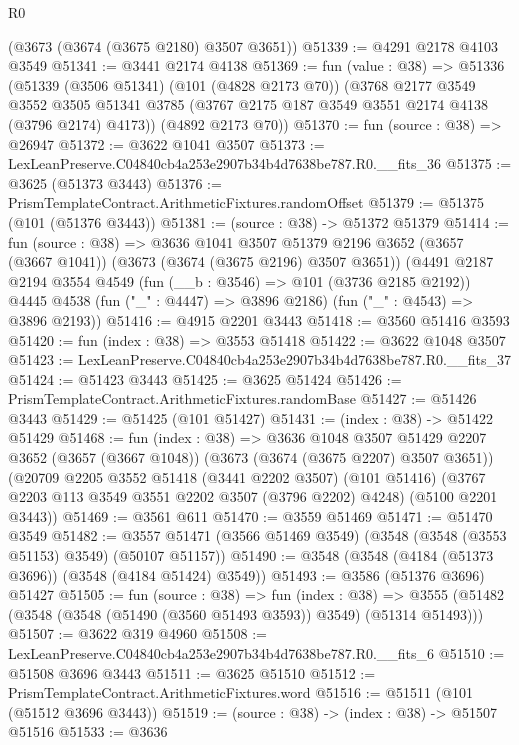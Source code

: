 \begin{lexlean}{R0}
\begin{coremodule}
    (@3673 (@3674 (@3675 @2180) @3507 @3651))
@51339 := @4291 @2178 @4103 @3549
@51341 := @3441 @2174 @4138
@51369 := fun (value : @38) =>
  @51336
    (@51339
      (@3506 @51341)
      (@101 (@4828 @2173 @70))
      (@3768
        @2177
        @3549
        @3552
        @3505
        @51341
        @3785
        (@3767 @2175 @187 @3549 @3551 @2174 @4138 (@3796 @2174) @4173))
      (@4892 @2173 @70))
@51370 := fun (source : @38) => @26947
@51372 := @3622 @1041 @3507
@51373 := LexLeanPreserve.C04840cb4a253e2907b34b4d7638be787.R0.__fits_36
@51375 := @3625 (@51373 @3443)
@51376 := PrismTemplateContract.ArithmeticFixtures.randomOffset
@51379 := @51375 (@101 (@51376 @3443))
@51381 := (source : @38) -> @51372 @51379
@51414 := fun (source : @38) =>
  @3636
    @1041
    @3507
    @51379
    @2196
    @3652
    (@3657 (@3667 @1041))
    (@3673 (@3674 (@3675 @2196) @3507 @3651))
    (@4491
      @2187
      @2194
      @3554
      @4549
      (fun (__b : @3546) => @101 (@3736 @2185 @2192))
      @4445
      @4538
      (fun ("_" : @4447) => @3896 @2186)
      (fun ("_" : @4543) => @3896 @2193))
@51416 := @4915 @2201 @3443
@51418 := @3560 @51416 @3593
@51420 := fun (index : @38) => @3553 @51418
@51422 := @3622 @1048 @3507
@51423 := LexLeanPreserve.C04840cb4a253e2907b34b4d7638be787.R0.__fits_37
@51424 := @51423 @3443
@51425 := @3625 @51424
@51426 := PrismTemplateContract.ArithmeticFixtures.randomBase
@51427 := @51426 @3443
@51429 := @51425 (@101 @51427)
@51431 := (index : @38) -> @51422 @51429
@51468 := fun (index : @38) =>
  @3636
    @1048
    @3507
    @51429
    @2207
    @3652
    (@3657 (@3667 @1048))
    (@3673 (@3674 (@3675 @2207) @3507 @3651))
    (@20709
      @2205
      @3552
      @51418
      (@3441 @2202 @3507)
      (@101 @51416)
      (@3767 @2203 @113 @3549 @3551 @2202 @3507 (@3796 @2202) @4248)
      (@5100 @2201 @3443))
@51469 := @3561 @611
@51470 := @3559 @51469
@51471 := @51470 @3549
@51482 := @3557 @51471 (@3566 @51469 @3549) (@3548 (@3548 (@3553 @51153) @3549) (@50107 @51157))
@51490 := @3548 (@3548 (@4184 (@51373 @3696)) (@3548 (@4184 @51424) @3549))
@51493 := @3586 (@51376 @3696) @51427
@51505 := fun (source : @38) =>
  fun (index : @38) =>
  @3555 (@51482 (@3548 (@3548 (@51490 (@3560 @51493 @3593)) @3549) (@51314 @51493)))
@51507 := @3622 @319 @4960
@51508 := LexLeanPreserve.C04840cb4a253e2907b34b4d7638be787.R0.__fits_6
@51510 := @51508 @3696 @3443
@51511 := @3625 @51510
@51512 := PrismTemplateContract.ArithmeticFixtures.word
@51516 := @51511 (@101 (@51512 @3696 @3443))
@51519 := (source : @38) -> (index : @38) -> @51507 @51516
@51533 := @3636

\end{coremodule}
\end{lexlean}
